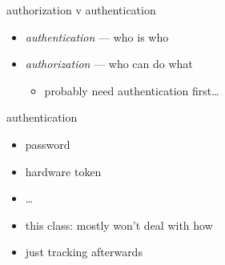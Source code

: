 \begin{frame}{authorization v authentication}
    \begin{itemize}
    \item \textit{authentication} --- who is who
    \vspace{.5cm}
    \item<2-> \textit{authorization} --- who can do what
        \begin{itemize}
        \item probably need authentication first\ldots
        \end{itemize}
    \end{itemize}
\end{frame}

\begin{frame}{authentication}
    \begin{itemize}
    \item password
    \item hardware token
    \item \ldots
    \vspace{.5cm}
    \item<2-> this class: mostly won't deal with how
    \item<2-> just tracking afterwards
    \end{itemize}
\end{frame}

